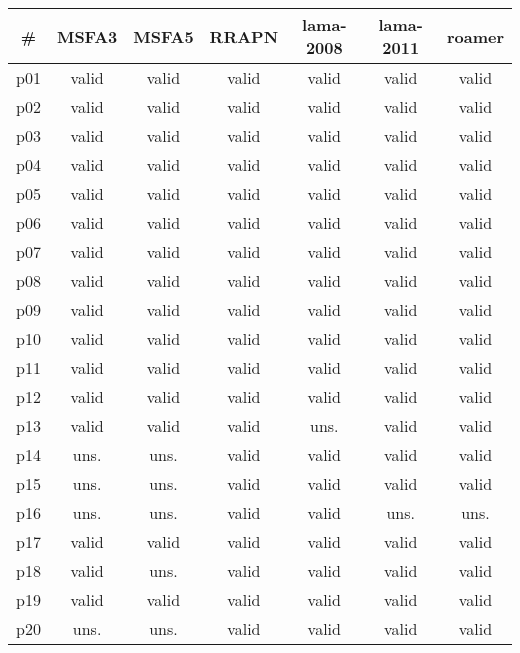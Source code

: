 \begin{tabular}{c||c|c|c|c|c|c}
\textbf{\#} & \textbf{MSFA3} & \textbf{MSFA5} & \textbf{RRAPN} & \textbf{lama-2008} & \textbf{lama-2011} & \textbf{roamer}\\
\hline
\hline
p01 & valid & valid & valid & valid & valid & valid\\
p02 & valid & valid & valid & valid & valid & valid\\
p03 & valid & valid & valid & valid & valid & valid\\
p04 & valid & valid & valid & valid & valid & valid\\
p05 & valid & valid & valid & valid & valid & valid\\
p06 & valid & valid & valid & valid & valid & valid\\
p07 & valid & valid & valid & valid & valid & valid\\
p08 & valid & valid & valid & valid & valid & valid\\
p09 & valid & valid & valid & valid & valid & valid\\
p10 & valid & valid & valid & valid & valid & valid\\
p11 & valid & valid & valid & valid & valid & valid\\
p12 & valid & valid & valid & valid & valid & valid\\
p13 & valid & valid & valid & uns. & valid & valid\\
p14 & uns. & uns. & valid & valid & valid & valid\\
p15 & uns. & uns. & valid & valid & valid & valid\\
p16 & uns. & uns. & valid & valid & uns. & uns.\\
p17 & valid & valid & valid & valid & valid & valid\\
p18 & valid & uns. & valid & valid & valid & valid\\
p19 & valid & valid & valid & valid & valid & valid\\
p20 & uns. & uns. & valid & valid & valid & valid\\
\end{tabular}

